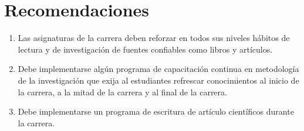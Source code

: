 \documentclass[a4paper,12pt]{article}
\begin{document}
\section{Recomendaciones}
\label{sec:recomendaciones}

\begin{enumerate}
\item Las asignaturas de la carrera deben reforzar en todos sus niveles hábitos de lectura y de investigación de fuentes confiables como libros y artículos.
\item Debe implementarse algún programa de capacitación continua en metodología de la investigación que exija al estudiantes refrescar conocimientos al inicio de la carrera, a la mitad de la carrera y al final de la carrera.
\item Debe implementarse un programa de escritura de artículo científicos durante la carrera. 
\end{enumerate}





\end{document}
